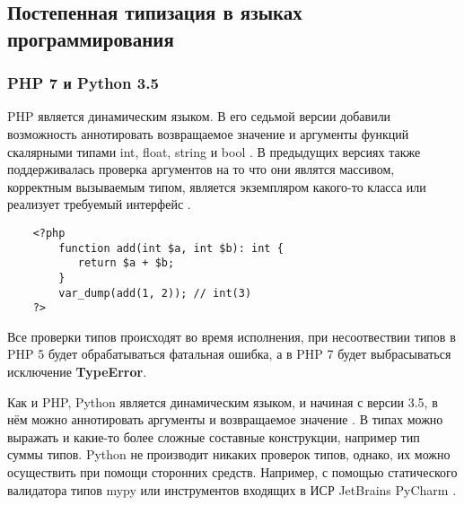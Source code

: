 \subsection{Постепенная типизация в языках программирования}

\subsubsection{PHP 7 и Python 3.5}

PHP является динамическим языком. В его седьмой версии добавили возможность аннотировать возвращаемое значение и аргументы функций скалярными типами int, float, string и bool \cite{wiki:phpScalarTypeHints}. В предыдущих версиях также поддерживалась проверка аргументов на то что они являтся массивом, корректным вызываемым типом, является экземпляром какого-то класса или реализует требуемый интерфейс \cite{wiki:phpTypeHints}.

\begin{verbatim}
    <?php        
        function add(int $a, int $b): int {
           return $a + $b;
        }
        var_dump(add(1, 2)); // int(3)
    ?>
\end{verbatim}
 

Все проверки типов происходят во время исполнения, при несоотвествии типов в PHP 5 будет обрабатываться фатальная ошибка, а в PHP 7 будет выбрасываться исключение \textbf{TypeError}.

Как и PHP, Python является динамическим языком, и начиная с версии 3.5, в нём можно аннотировать аргументы и возвращаемое значение \cite{wiki:pythonPep484TypeHints}. В типах можно выражать и какие-то более сложные составные конструкции, например тип суммы типов. %
%    
Python не производит никаких проверок типов, однако, их можно осуществить при помощи сторонних средств. Например, с помощью статического валидатора типов mypy \cite{python:mypyHomepage} или инструментов входящих в ИСР JetBrains PyCharm \cite{python:PyCharmHomepage}.

